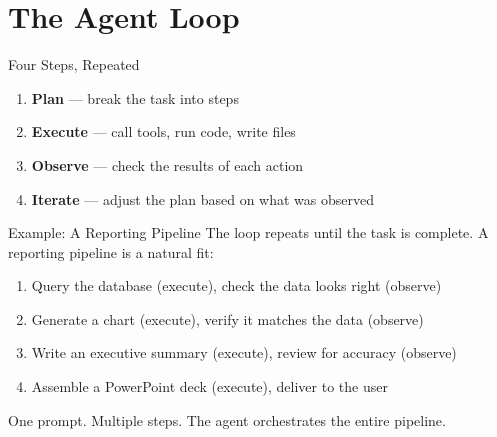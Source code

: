 \documentclass[aspectratio=169]{beamer}
\begin{document}
\section{The Agent Loop}

\begin{frame}{Four Steps, Repeated}
\begin{center}
\end{center}
\vspace{0.2cm}
\begin{enumerate}
  \item \textbf{Plan} --- break the task into steps
  \item \textbf{Execute} --- call tools, run code, write files
  \item \textbf{Observe} --- check the results of each action
  \item \textbf{Iterate} --- adjust the plan based on what was observed
\end{enumerate}
\end{frame}

\begin{frame}{Example: A Reporting Pipeline}
The loop repeats until the task is complete.  A reporting pipeline is a natural fit:
\vspace{0.3cm}
\begin{enumerate}
  \item Query the database (execute), check the data looks right (observe)
  \item Generate a chart (execute), verify it matches the data (observe)
  \item Write an executive summary (execute), review for accuracy (observe)
  \item Assemble a PowerPoint deck (execute), deliver to the user
\end{enumerate}
\vspace{0.3cm}
\alert{One prompt.  Multiple steps.  The agent orchestrates the entire pipeline.}
\end{frame}
\end{document}

